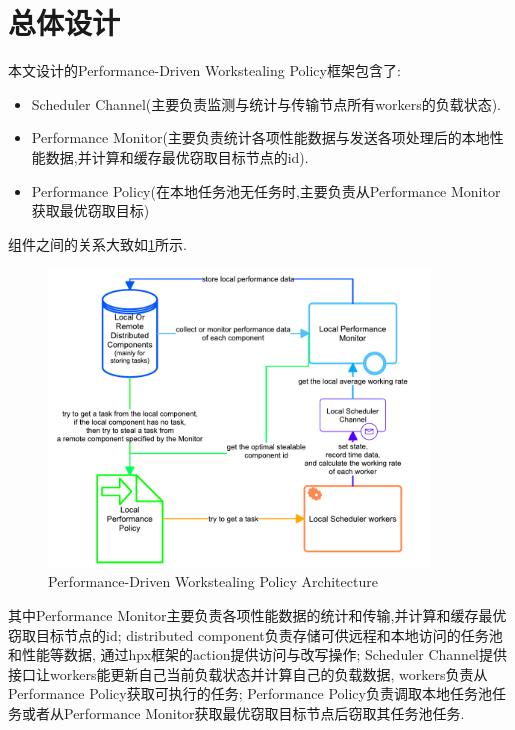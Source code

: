 \documentclass{mproj}
\begin{document}
\section{总体设计}

本文设计的Performance-Driven Workstealing Policy框架包含了:
\begin{itemize}
    \item Scheduler Channel(主要负责监测与统计与传输节点所有workers的负载状态).
    \item Performance Monitor(主要负责统计各项性能数据与发送各项处理后的本地性能数据,并计算和缓存最优窃取目标节点的id).
    \item Performance Policy(在本地任务池无任务时,主要负责从Performance Monitor获取最优窃取目标)
\end{itemize}

组件之间的关系大致如\cref{fig:overall_architecture}所示.
\begin{figure}[h] %
    \centering %
    \includegraphics[width=0.9\textwidth]{images/overall_architecture.pdf} %
    \caption{Performance-Driven Workstealing Policy Architecture} %
    \label{fig:overall_architecture} %
\end{figure}
\FloatBarrier

其中Performance Monitor主要负责各项性能数据的统计和传输,并计算和缓存最优窃取目标节点的id;
distributed component负责存储可供远程和本地访问的任务池和性能等数据,
通过hpx框架的action提供访问与改写操作;
Scheduler Channel提供接口让workers能更新自己当前负载状态并计算自己的负载数据,
workers负责从Performance Policy获取可执行的任务;
Performance Policy负责调取本地任务池任务或者从Performance Monitor获取最优窃取目标节点后窃取其任务池任务.
\end{document}
